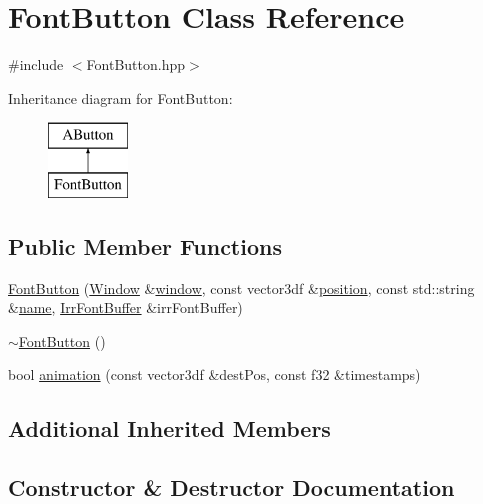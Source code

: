 \hypertarget{class_font_button}{}\section{Font\+Button Class Reference}
\label{class_font_button}


{\ttfamily \#include $<$Font\+Button.\+hpp$>$}

Inheritance diagram for Font\+Button\+:\begin{figure}[H]
\begin{center}
\leavevmode
\includegraphics[height=2.000000cm]{class_font_button}
\end{center}
\end{figure}
\subsection*{Public Member Functions}
\begin{DoxyCompactItemize}
\item 
\mbox{\hyperlink{class_font_button_a825402fc964bc7addf4f9f62b35898b2}{Font\+Button}} (\mbox{\hyperlink{class_window}{Window}} \&\mbox{\hyperlink{class_a_button_ab8b7ee994bd3b81cfd4ad639733c19df}{window}}, const vector3df \&\mbox{\hyperlink{class_a_button_a71db15822a0eeb093a07e2ac7ff76cd8}{position}}, const std\+::string \&\mbox{\hyperlink{class_a_button_aad1d2351e9dc41d747726be929fdb459}{name}}, \mbox{\hyperlink{class_irr_font_buffer}{Irr\+Font\+Buffer}} \&irr\+Font\+Buffer)
\item 
\mbox{\hyperlink{class_font_button_ac0f0adb778164a82ecc1c2a33c49c15d}{$\sim$\+Font\+Button}} ()
\item 
bool \mbox{\hyperlink{class_font_button_aa5855d430b2f25d72a847c60a03ff159}{animation}} (const vector3df \&dest\+Pos, const f32 \&timestamps)
\end{DoxyCompactItemize}
\subsection*{Additional Inherited Members}


\subsection{Constructor \& Destructor Documentation}
\mbox{\label{class_font_button_a825402fc964bc7addf4f9f62b35898b2}} 
